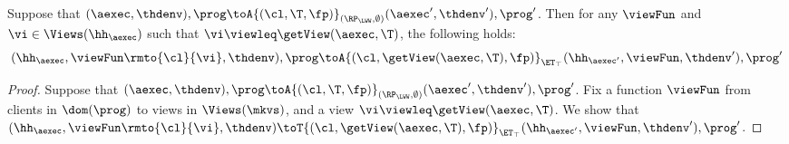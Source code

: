 \begin{proposition}
\label{prop:aexec2kv_transition}
Suppose that $(\aexec, \thdenv), \prog \toA{(\cl, \T, \fp)}_{(\RP_{\LWW}, \emptyset)} (\aexec', \thdenv'), \prog'$. 
Then for any $\viewFun$ and $\vi \in \Views(\hh_{\aexec})$ such that $\vi \viewleq \getView(\aexec, \T)$, 
the following holds:
\[
    (\hh_{\aexec}, \viewFun\rmto{\cl}{\vi}, \thdenv), \prog 
    \toA{(\cl, \getView(\aexec, \T), \fp)}_{\ET_{\top}} (\hh_{\aexec'}, \viewFun, \thdenv'), \prog'
\]
\end{proposition}
\begin{proof}
Suppose that $(\aexec, \thdenv), \prog \toA{(\cl, \T, \fp)}_{(\RP_{\LWW}, \emptyset)} (\aexec', \thdenv'), \prog'$. 
Fix a function $\viewFun$ from clients in $\dom(\prog)$ to views in $\Views(\mkvs)$, and a view $\vi \viewleq \getView(\aexec, \T)$.
We show that 
$(\hh_{\aexec}, \viewFun\rmto{\cl}{\vi}, \thdenv) \toT{(\cl, \getView(\aexec, \T), \fp)}_{\ET_{\top}} (\hh_{\aexec'}, 
\viewFun, \thdenv'), \prog'$. 


\end{proof}
